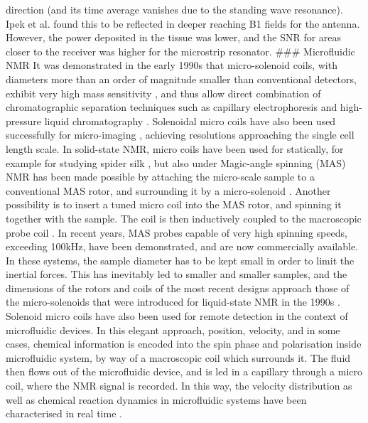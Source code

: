 direction (and its time average vanishes due to the standing wave
resonance). Ipek et al. found this to be reflected in deeper reaching B1
fields for the antenna. However, the power deposited in the tissue was
lower, and the SNR for areas closer to the receiver was higher for the
microstrip resonator. \#\#\# Microfluidic NMR It was demonstrated in the
early 1990s that micro-solenoid coils, with diameters more than an order
of magnitude smaller than conventional detectors, exhibit very high mass
sensitivity \cite{Olson:1995vu,Sweedler:1997tl,Lacey:1999vk}, and thus allow
direct combination of chromatographic separation techniques such as
capillary electrophoresis \cite{Peck:1994hh,Wu:1994ks,Olson:1999ed} and
high-pressure liquid chromatography \cite{Lacey:2001dr}. Solenoidal micro
coils have also been used successfully for micro-imaging
\cite{Seeber:2000iy,Ciobanu:2002wo}, achieving resolutions approaching the
single cell length scale. In solid-state NMR, micro coils have been used
for statically, for example for studying spider silk
\cite{KYamauchi:2005jv}, but also under Magic-angle spinning (MAS) NMR has
been made possible by attaching the micro-scale sample to a conventional
MAS rotor, and surrounding it by a micro-solenoid \cite{Kentgens:2008ch}.
Another possibility is to insert a tuned micro coil into the MAS rotor,
and spinning it together with the sample. The coil is then inductively
coupled to the macroscopic probe coil
\cite{sakellariou2007hrh,Jacquinot:2011cj}. In recent years, MAS probes
capable of very high spinning speeds, exceeding 100kHz, have been
demonstrated, and are now commercially available. In these systems, the
sample diameter has to be kept small in order to limit the inertial
forces. This has inevitably led to smaller and smaller samples, and the
dimensions of the rotors and coils of the most recent designs approach
those of the micro-solenoids that were introduced for liquid-state NMR
in the 1990s \cite{Samoson:2010et}. Solenoid micro coils have also been
used for remote detection in the context of microfluidic devices. In
this elegant approach, position, velocity, and in some cases, chemical
information is encoded into the spin phase and polarisation inside
microfluidic system, by way of a macroscopic coil which surrounds it.
The fluid then flows out of the microfluidic device, and is led in a
capillary through a micro coil, where the NMR signal is recorded. In
this way, the velocity distribution as well as chemical reaction
dynamics in microfluidic systems have been characterised in real time
\cite{Hilty:2005eq, McDonnell:2005dn,Harel:2007bs, Bouchard:2008hv,
Ledbetter:2008kp,Harel:2009eg,Bajaj:2010cy,Telkki:2011wi,Telkki:2014jf}.

